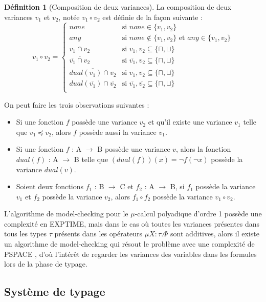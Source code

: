 \documentclass{rapport}
\theoremstyle{plain}
\theoremstyle{remark}
\theoremstyle{definition}
\newtheorem{dfn}{Définition}
\begin{document}
\begin{dfn} [Composition de deux variances] La composition de deux variances $v_1$ et $v_2$, notée $v_1 \circ v_2$ est définie de la façon suivante : 
\[v_1 \circ v_2 = \left\{
\begin{array}{ll}
none & \text{si }none \in \{v_1, v_2\}\\
any & \text{si }none \notin \{v_1, v_2\} \text{ et } any \in \{v_1, v_2\}\\
v_1 \cap v_2 & \text{si }v_1, v_2 \subseteq \{\sqcap, \sqcup\}\\
\overline{\overline{v_1} \cap v_2} & \text{si }\overline{v_1}, v_2 \subseteq \{\sqcap, \sqcup\}\\
\overline{dual(v_1) \cap \overline{v_2}} & \text{si }v_1, \overline{v_2} \subseteq \{\sqcap, \sqcup\}\\
dual(\overline{v_1}) \cap \overline{v_2} & \text{si }\overline{v_1}, \overline{v_2} \subseteq \{\sqcap, \sqcup\}\\
\end{array}\right.\]
\end{dfn}

On peut faire les trois observations suivantes :
\begin{itemize}
	\item Si une fonction $f$ possède une variance $v_2$ et qu'il existe une variance $v_1$ telle que $v_1 \preccurlyeq v_2$, alors $f$ possède aussi la variance $v_1$.
	\item Si une fonction $f$ : A $\rightarrow$ B possède une variance $v$, alors la fonction $dual(f)$ : A $\rightarrow$ B telle que $(dual(f))(x) = \neg f(\neg x)$ possède la variance $dual(v)$.
	\item Soient deux fonctions $f_1$ : B $\rightarrow$ C et $f_2$ : A $\rightarrow$ B, si $f_1$ possède la variance $v_1$ et $f_2$ possède la variance $v_2$, alors $f_1 \circ f_2$ possède la variance $v_1 \circ v_2$.
\end{itemize}

L'algorithme de model-checking pour le $\mu$-calcul polyadique d'ordre 1 possède une complexité en EXPTIME, mais dans le cas où toutes les variances présentes dans tous les types $\tau$ présents dans les opérateurs ${\mu X : \tau . \Phi}$ sont additives, alors il existe un algorithme de model-checking qui résout le problème avec une complexité de PSPACE \citep{lange2014model}, d'où l'intérêt de regarder les variances des variables dans les formules lors de la phase de typage. 

\subsection{Système de typage\label{syst typage}}
\end{document}
